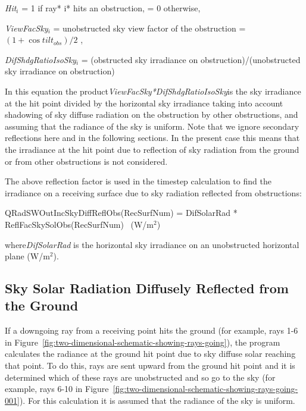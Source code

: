 \emph{Hit\(_{i}\)} = 1 if ray* i* hits an obstruction, = 0 otherwise,

\emph{ViewFacSky\(_{i}\)} = unobstructed sky view factor of the obstruction = \((1 + \cos til{t_{obs}})/2\) ,

\emph{DifShdgRatioIsoSky\(_{i}\)} = (obstructed sky irradiance on obstruction)/(unobstructed sky irradiance on obstruction)

In this equation the product\emph{ViewFacSky*DifShdgRatioIsoSky}is the sky irradiance at the hit point divided by the horizontal sky irradiance taking into account shadowing of sky diffuse radiation on the obstruction by other obstructions, and assuming that the radiance of the sky is uniform. Note that we ignore secondary reflections here and in the following sections. In the present case this means that the irradiance at the hit point due to reflection of sky radiation from the ground or from other obstructions is not considered.

The above reflection factor is used in the timestep calculation to find the irradiance on a receiving surface due to sky radiation reflected from obstructions:

QRadSWOutIncSkyDiffReflObs(RecSurfNum) = DifSolarRad * ReflFacSkySolObs(RecSurfNum)~ (W/m\(^{2}\))

where\emph{DifSolarRad} is the horizontal sky irradiance on an unobstructed horizontal plane (W/m\(^{2}\)).

\subsection{Sky Solar Radiation Diffusely Reflected from the Ground}\label{sky-solar-radiation-diffusely-reflected-from-the-ground}

If a downgoing ray from a receiving point hits the ground (for example, rays 1-6 in Figure~\ref{fig:two-dimensional-schematic-showing-rays-going}), the program calculates the radiance at the ground hit point due to sky diffuse solar reaching that point. To do this, rays are sent upward from the ground hit point and it is determined which of these rays are unobstructed and so go to the sky (for example, rays 6-10 in Figure~\ref{fig:two-dimensional-schematic-showing-rays-going-001}). For this calculation it is assumed that the radiance of the sky is uniform.

